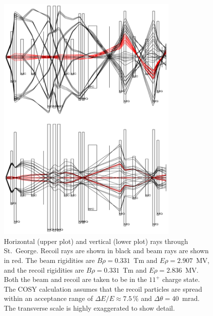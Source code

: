 \begin{figure}
    \begin{center}
        \centerline{
            \includegraphics[width=0.8\textwidth]{figures/raytrace.png}}
        \caption[Horizontal and vertical rays through St.\ George]{Horizontal
            (upper plot) and vertical (lower plot) rays through St.\ George.
            Recoil  rays are shown in black and beam 
            rays are shown in red.
            The beam rigidities are $B\rho = 0.331$~Tm and $E\rho = 2.907$~MV,
            and the recoil rigidities are $B\rho = 0.331$~Tm and
            $E\rho = 2.836$~MV. Both the beam and recoil
            are taken to be in the $11^+$ charge state.
            The COSY calculation assumes that the recoil particles are spread
            within an acceptance range of $\Delta E/E \approx7.5$\,\% and
            $\Delta\theta = 40$~mrad. The transverse scale is highly
            exaggerated to show detail.}
        \label{fig:raytrace}
    \end{center}
\end{figure}


